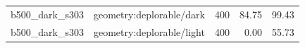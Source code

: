 \begin{longtable}{l>{\raggedright\arraybackslash}p{.42\linewidth}rrr}
b500\_\allowbreak{}dark\_\allowbreak{}s303 & %
geometry:deplorable/dark & %
400 & %
84.75 & %
99.43 \\ %

b500\_\allowbreak{}dark\_\allowbreak{}s303 & %
geometry:deplorable/light & %
400 & %
0.00 & %
55.73 \\ %


\end{longtable}
